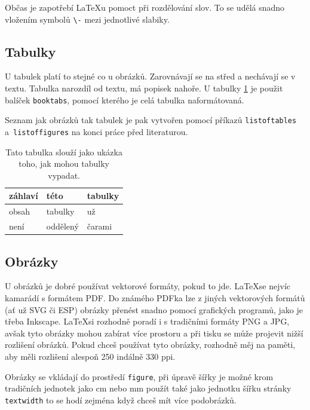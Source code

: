 \documentclass[12pt, a4paper,
oneside,      %
openany
]{report}
\begin{document}
	Občas je zapotřebí \LaTeX{u} pomoct při rozdělování slov. To se udělá snadno vložením symbolů \verb|\-| mezi jednotlivé slabiky.
	
	\subsection{Tabulky}
	
	U tabulek platí to stejné co u obrázků. Zarovnávají se na střed a nechávají se  v textu. Tabulka narozdíl od textu, má popisek nahoře. U tabulky \ref{tab:ukazka} je použit balíček \texttt{booktabs}, pomocí kterého je celá tabulka naformátovaná.
	
	Seznam jak obrázků tak tabulek je pak vytvořen pomocí příkazů \texttt{listoftables} a~\texttt{list\-of\-fig\-ures} na konci práce před literaturou.
	
	\begin{table}[h]
		\caption{Tato tabulka slouží jako ukázka toho, jak mohou tabulky vypadat.} %
		\label{tab:ukazka} %
		\centering
		\begin{tabular}{lll}
			\toprule %
			záhlaví& této & tabulky\\
			\midrule
			obsah&tabulky& už\\
			není & oddělený &čarami\\
			\bottomrule
		\end{tabular}
	\end{table}
	
	
	\subsection{Obrázky}
	
	U obrázků je dobré používat vektorové formáty, pokud to jde. \LaTeX se nejvíc kamarádí s formátem PDF. Do známého PDFka lze z jiných vektorových formátů (ať už SVG či ESP) obrázky přenést snadno pomocí grafických programů, jako je třeba Inkscape. \LaTeX si rozhodně poradí i s tradičními formáty PNG a JPG, avšak tyto obrázky mohou zabírat více prostoru a při tisku se může projevit nižší rozlišení obrázků. Pokud chceš používat tyto obrázky, rozhodně měj na paměti, aby měli rozlišení alespoň 250 indálně 330 ppi.
	
	Obrázky se vkládají do prostředí \texttt{figure}, při úpravě šířky je možné krom tradičních jednotek jako cm nebo mm použít také jako jednotku šířku stránky \texttt{textwidth} to se hodí zejména když chceš mít více podobrázků. 
	
\end{document}
